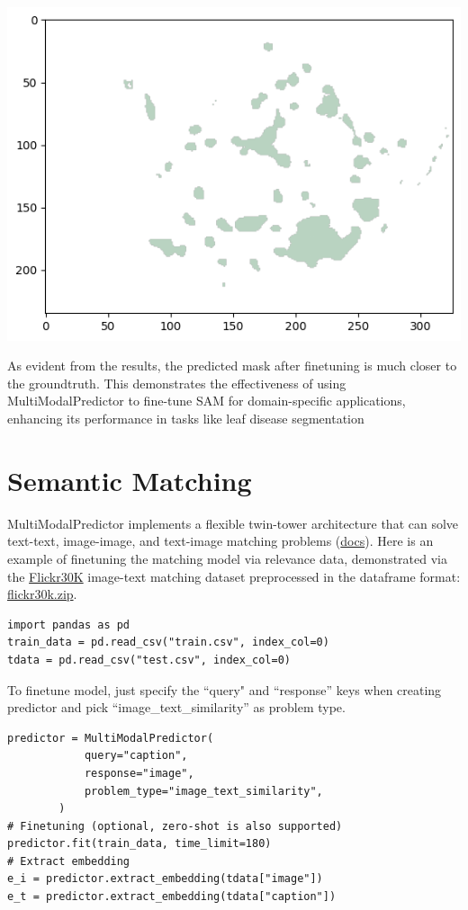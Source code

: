 \begin{center}
\begin{minipage}{0.3\linewidth}
    \includegraphics[width=\linewidth]{images/leaf_seg.png}
    \end{minipage}%
\end{center}

As evident from the results, the predicted mask after finetuning is much closer to the groundtruth. This demonstrates the effectiveness of using MultiModalPredictor to fine-tune SAM for domain-specific applications, enhancing its performance in tasks like leaf disease segmentation

\section*{Semantic Matching}
MultiModalPredictor implements a flexible twin-tower architecture that can solve text-text, image-image, and text-image matching problems (\href{https://auto.gluon.ai/stable/tutorials/multimodal/matching/index.html}{docs}). Here is an example of finetuning the matching model via relevance data, demonstrated via the \href{https://paperswithcode.com/dataset/flickr30k}{Flickr30K} image-text matching dataset preprocessed in the dataframe format: \href{https://automl-mm-bench.s3.amazonaws.com/flickr30k.zip}{flickr30k.zip}.
\begin{verbatim}
import pandas as pd
train_data = pd.read_csv("train.csv", index_col=0)
tdata = pd.read_csv("test.csv", index_col=0)
\end{verbatim}

To finetune model, just specify the ``query" and ``response'' keys when creating predictor and pick ``image\_text\_similarity'' as problem type.
\begin{verbatim}
predictor = MultiModalPredictor(
            query="caption",
            response="image",
            problem_type="image_text_similarity",
        )
# Finetuning (optional, zero-shot is also supported)
predictor.fit(train_data, time_limit=180)
# Extract embedding
e_i = predictor.extract_embedding(tdata["image"])
e_t = predictor.extract_embedding(tdata["caption"])
\end{verbatim}

